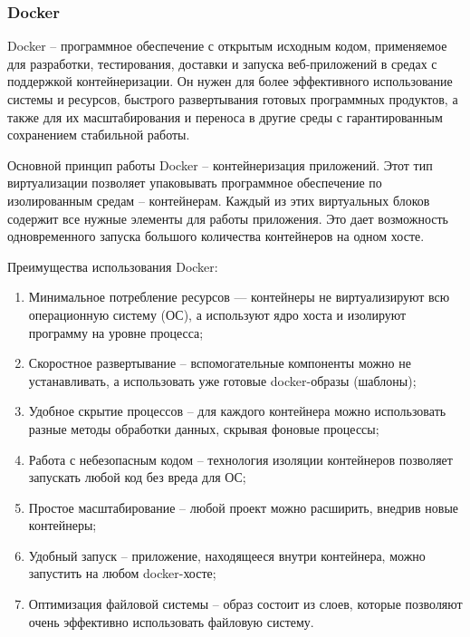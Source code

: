 \subsubsection{Docker}
	
Docker -- программное обеспечение с открытым исходным кодом, применяемое для разработки, тестирования, доставки и запуска веб-приложений в средах с поддержкой контейнеризации. Он нужен для более эффективного использование системы и ресурсов, быстрого развертывания готовых программных продуктов, а также для их масштабирования и переноса в другие среды с гарантированным сохранением стабильной работы.
	
Основной принцип работы Docker -- контейнеризация приложений. Этот тип виртуализации позволяет упаковывать программное обеспечение по изолированным средам -- контейнерам. Каждый из этих виртуальных блоков содержит все нужные элементы для работы приложения. Это дает возможность одновременного запуска большого количества контейнеров на одном хосте.
	
Преимущества использования Docker:
\begin{enumerate}
	\item Минимальное потребление ресурсов — контейнеры не виртуализируют всю операционную систему (ОС), а используют ядро хоста и изолируют программу на уровне процесса;
	\item Скоростное развертывание -- вспомогательные компоненты можно не устанавливать, а использовать уже готовые docker-образы (шаблоны);
	\item Удобное скрытие процессов -- для каждого контейнера можно использовать разные методы обработки данных, скрывая фоновые процессы;
	\item Работа с небезопасным кодом -- технология изоляции контейнеров позволяет запускать любой код без вреда для ОС;
	\item Простое масштабирование -- любой проект можно расширить, внедрив новые контейнеры;
	\item Удобный запуск -- приложение, находящееся внутри контейнера, можно запустить на любом docker-хосте;
	\item Оптимизация файловой системы -- образ состоит из слоев, которые позволяют очень эффективно использовать файловую систему.
\end{enumerate}
	
